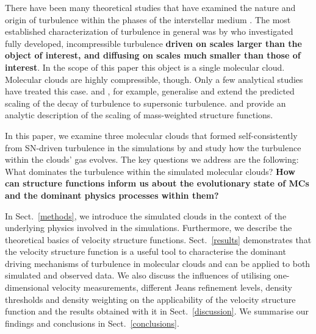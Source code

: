There have been many theoretical studies that have examined the nature and origin of turbulence within the phases of the interstellar medium \citep[ISM;][and references within]{MacLow2004}. 
The most established 
     characterization of turbulence in general was 
by \citet{Kolmogorov1941} who investigated fully developed, incompressible turbulence \textbf{driven on scales larger than the object of interest, and diffusing on scales much smaller than those of interest}.
In the scope of this paper this object is a single molecular cloud. 
    Molecular clouds are highly compressible, though.  Only a few analytical studies have treated this case.
\citet{She1994} and \citet{Boldyrev2002}, for example, generalise and extend the predicted scaling of the decay of turbulence to supersonic turbulence.
\citet{Galtier2011} and \citet{Banerjee2013} provide an analytic description of the scaling of mass-weighted structure functions.

In this paper, we examine three molecular clouds that formed 
   self-consistently from SN-driven turbulence 
in the simulations by \citet[ and  hereafter]{IbanezMejia2016,IbanezMejia2017} and study how the turbulence within the clouds' gas evolves.
The key questions we 
    address
are the following: 
What dominates the turbulence within the simulated molecular clouds? 
\textbf{How can structure functions inform us about the evolutionary state of MCs and the dominant physics processes within them?}

In Sect.~\ref{methods}, we introduce the simulated clouds in the context of the underlying physics involved in the simulations.
Furthermore, we describe the theoretical basics of velocity structure functions.
Sect.~\ref{results} demonstrates that the velocity structure function is a useful tool to characterise the dominant driving mechanisms of turbulence in molecular clouds and can be applied to both simulated and observed data. 
We also discuss the influences of utilising one-dimensional velocity measurements, different Jeans refinement levels, density thresholds and density weighting on the applicability of the velocity structure function and the results obtained with it in Sect.~\ref{discussion}.  
We summarise our findings and conclusions in Sect.~\ref{conclusions}.



\endinput
